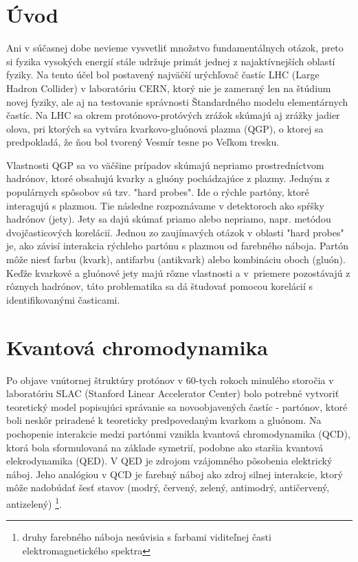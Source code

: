 \documentclass[thesismargins, thesislinespacing]{rnthesis}
\begin{document}
\chapter*{Úvod}

Ani v súčasnej dobe nevieme vysvetliť množstvo fundamentálnych otázok, preto si fyzika vysokých energií stále udržuje primát jednej z najaktívnejších oblastí fyziky. Na tento účel bol postavený najväčší urýchľovač častíc LHC (Large Hadron Collider) v laboratóriu CERN, ktorý nie je zameraný len na štúdium novej fyziky, ale aj na testovanie správnosti Štandardného modelu elementárnych častíc. Na LHC sa okrem protónovo-protóvých zrážok skúmajú aj zrážky jadier olova, pri ktorých  sa vytvára kvarkovo-gluónová plazma (QGP), o ktorej sa predpokladá, že ňou bol tvorený Vesmír tesne po Veľkom tresku. 

Vlastnosti QGP sa vo väčšine prípadov skúmajú nepriamo prostredníctvom \-had\-ró\-nov, ktoré obsahujú kvarky a gluóny pochádzajúce z plazmy. Jedným z populárnych \-spô\-so\-bov sú tzv. "hard probes". Ide o rýchle partóny, ktoré interagujú s plazmou. Tie následne rozpoznávame v detektoroch ako spŕšky hadrónov (jety). Jety sa dajú skúmať \-pria\-mo alebo nepriamo, napr. metódou dvojčasticových korelácií. Jednou zo zaujímavých otázok v oblasti "hard probes" \-je, ako závisí interakcia rýchleho partónu s plazmou od farebného náboja. Partón môže niesť farbu (kvark), antifarbu (antikvark) alebo kombináciu oboch (gluón). Keďže kvarkové a gluónové jety majú rôzne vlastnosti a v~priemere pozostávajú z rôznych hadrónov, táto problematika sa dá študovať pomocou korelácií s identifikovanými časticami.  

\chapter{Kvantová chromodynamika}

Po objave vnútornej štruktúry protónov v 60-tych rokoch minulého storočia v laboratóriu SLAC (Stanford Linear Accelerator Center) bolo potrebné vytvoriť teoretický model popisujúci správanie sa novoobjavených častíc - partónov, ktoré boli neskôr priradené k teoreticky predpovedaným kvarkom a gluónom. Na pochopenie interakcie medzi partónmi vznikla kvantová chromodynamika (QCD), ktorá bola sformulovaná na základe symetrií, podobne ako staršia kvantová elekrodynamika (QED). V QED je zdrojom vzájomného pôsobenia elektrický náboj. Jeho analógiou v QCD je farebný náboj ako zdroj silnej interakcie, ktorý môže nadobúdať šesť stavov (modrý, červený, zelený, antimodrý, antičervený, antizelený) \footnote{druhy farebného náboja nesúvisia s farbami viditeľnej časti elektromagnetického spektra}.
\end{document}
